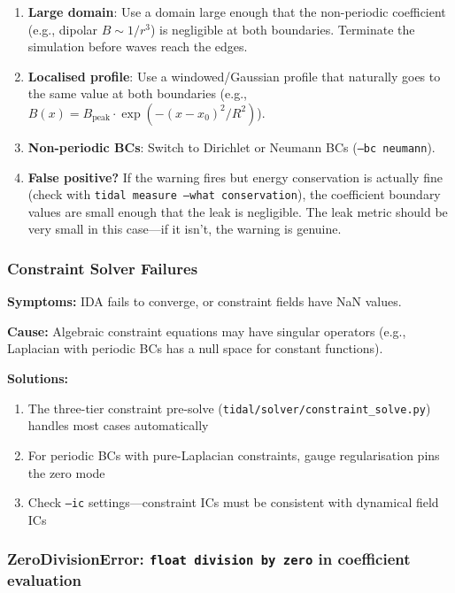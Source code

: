 \begin{enumerate}
  \item \textbf{Large domain}: Use a domain large enough that the non-periodic coefficient (e.g., dipolar $B \sim 1/r^3$) is negligible at both boundaries. Terminate the simulation before waves reach the edges.
  \item \textbf{Localised profile}: Use a windowed/Gaussian profile that naturally goes to the same value at both boundaries (e.g., $B(x) = B_\text{peak} \cdot \exp(-(x - x_0)^2 / R^2)$).
  \item \textbf{Non-periodic BCs}: Switch to Dirichlet or Neumann BCs (\texttt{--bc neumann}).
  \item \textbf{False positive?} If the warning fires but energy conservation is actually fine (check with \texttt{tidal measure --what conservation}), the coefficient boundary values are small enough that the leak is negligible. The leak metric should be very small in this case---if it isn't, the warning is genuine.
\end{enumerate}

\subsubsection{Constraint Solver Failures}

\textbf{Symptoms:} IDA fails to converge, or constraint fields have NaN values.

\textbf{Cause:} Algebraic constraint equations may have singular operators (e.g., Laplacian with periodic BCs has a null space for constant functions).

\textbf{Solutions:}

\begin{enumerate}
  \item The three-tier constraint pre-solve (\texttt{tidal/solver/constraint\_solve.py}) handles most cases automatically
  \item For periodic BCs with pure-Laplacian constraints, gauge regularisation pins the zero mode
  \item Check \texttt{--ic} settings---constraint ICs must be consistent with dynamical field ICs
\end{enumerate}


\subsubsection{ZeroDivisionError: \texttt{float division by zero} in coefficient evaluation}
\label{sec:troubleshooting-zerodiv-kinetic}

